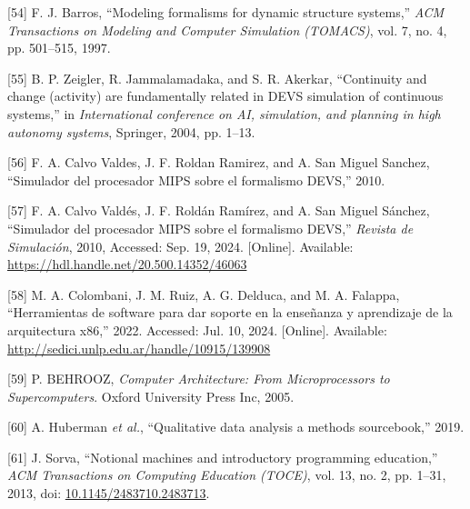 \documentclass[12pt,oneside]{templates/unerthesis}
\newcommand{\CSLLeftMargin}[1]{#1} %
\newcommand{\CSLRightInline}[1]{#1} %
\newlength{\cslhangindent}
\newenvironment{CSLReferences}[2] %
 {\setlength{\parindent}{0pt}%
  \setlength{\leftskip}{#1 pt\relax}%
  \setlength{\parskip}{#2 pt\relax}%
  \everypar{\setlength{\hangindent}{\cslhangindent}}}
 {\par}
\begin{document}
\begin{CSLReferences}{0}{0}
\leavevmode{}%
\CSLLeftMargin{{[}54{]} }%
\CSLRightInline{F. J. Barros, {``Modeling formalisms for dynamic structure systems,''} \emph{ACM Transactions on Modeling and Computer Simulation (TOMACS)}, vol. 7, no. 4, pp. 501--515, 1997.}

\leavevmode{}%
\CSLLeftMargin{{[}55{]} }%
\CSLRightInline{B. P. Zeigler, R. Jammalamadaka, and S. R. Akerkar, {``Continuity and change (activity) are fundamentally related in DEVS simulation of continuous systems,''} in \emph{International conference on AI, simulation, and planning in high autonomy systems}, Springer, 2004, pp. 1--13.}

\leavevmode{}%
\CSLLeftMargin{{[}56{]} }%
\CSLRightInline{F. A. Calvo Valdes, J. F. Roldan Ramirez, and A. San Miguel Sanchez, {``Simulador del procesador MIPS sobre el formalismo DEVS,''} 2010.}

\leavevmode{}%
\CSLLeftMargin{{[}57{]} }%
\CSLRightInline{F. A. Calvo Valdés, J. F. Roldán Ramírez, and A. San Miguel Sánchez, {``Simulador del procesador {MIPS} sobre el formalismo {DEVS},''} \emph{Revista de Simulación}, 2010, Accessed: Sep. 19, 2024. {[}Online{]}. Available: \url{https://hdl.handle.net/20.500.14352/46063}}

\leavevmode{}%
\CSLLeftMargin{{[}58{]} }%
\CSLRightInline{M. A. Colombani, J. M. Ruiz, A. G. Delduca, and M. A. Falappa, {``Herramientas de software para dar soporte en la enseñanza y aprendizaje de la arquitectura x86,''} 2022. Accessed: Jul. 10, 2024. {[}Online{]}. Available: \url{http://sedici.unlp.edu.ar/handle/10915/139908}}

\leavevmode{}%
\CSLLeftMargin{{[}59{]} }%
\CSLRightInline{P. BEHROOZ, \emph{Computer {Architecture}: {From} {Microprocessors} to {Supercomputers}}. Oxford University Press Inc, 2005.}

\leavevmode{}%
\CSLLeftMargin{{[}60{]} }%
\CSLRightInline{A. Huberman \emph{et al.}, {``Qualitative data analysis a methods sourcebook,''} 2019.}

\leavevmode{}%
\CSLLeftMargin{{[}61{]} }%
\CSLRightInline{J. Sorva, {``Notional machines and introductory programming education,''} \emph{ACM Transactions on Computing Education (TOCE)}, vol. 13, no. 2, pp. 1--31, 2013, doi: \href{https://doi.org/10.1145/2483710.2483713}{10.1145/2483710.2483713}.}


\end{CSLReferences}
\end{document}
